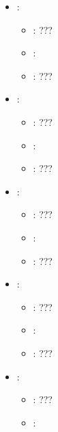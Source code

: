 \begin{itemize}
\begin{itemize}
                \item \optionDefaultValue{}: 
                \item \optionDescrption{}: ???
           \end{itemize}
    \item {}:
           \begin{itemize}
                \item \optionPossibleValues{}: ???
                \item \optionDefaultValue{}: 
                \item \optionDescrption{}: ???
           \end{itemize}
    \item {}:
           \begin{itemize}
                \item \optionPossibleValues{}: ???
                \item \optionDefaultValue{}: 
                \item \optionDescrption{}: ???
           \end{itemize}
    \item {}:
           \begin{itemize}
                \item \optionPossibleValues{}: ???
                \item \optionDefaultValue{}: 
                \item \optionDescrption{}: ???
           \end{itemize}
    \item {}:
           \begin{itemize}
                \item \optionPossibleValues{}: ???
                \item \optionDefaultValue{}: 
                \item \optionDescrption{}: ???
           \end{itemize}
    \item {}:
           \begin{itemize}
                \item \optionPossibleValues{}: ???
                \item \optionDefaultValue{}: 

\end{itemize}
\end{itemize}
